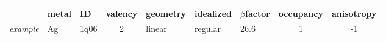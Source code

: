 \begin{tabular}{lllclllcc}
  \toprule
  & metal & ID & valency & geometry & idealized & $\beta$factor & occupancy & anisotropy \\
  \midrule
  \textit{example} & Ag & 1q06 & 2 & linear & regular & 26.6 & 1 & -1 \\
  \bottomrule
\end{tabular}

